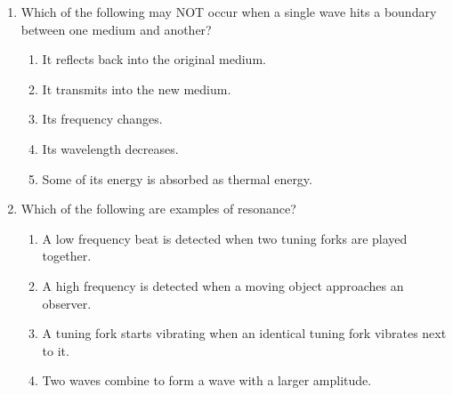 \documentclass{../../../oss-classkick}
\begin{document}
\begin{multicols}{2}
\begin{enumerate}[leftmargin=18pt,resume]
  \item Which of the following may NOT occur when a single wave hits a boundary
    between one medium and another?
    \begin{enumerate}[nosep,leftmargin=18pt,label=(\Alph*)]
    \item It reflects back into the original medium.
    \item It transmits into the new medium.
    \item Its frequency changes.
    \item Its wavelength decreases.
    \item Some of its energy is absorbed as thermal energy.
    \end{enumerate}
    \vspace{.7in}
    
  \item Which of the following are examples of resonance?
    \label{multi-last}
    \begin{enumerate}[nosep,leftmargin=18pt,label=(\Alph*)]
    \item A low frequency beat is detected when two tuning forks are played
      together.
    \item A high frequency is detected when a moving object approaches an
      observer.
    \item A tuning fork starts vibrating when an identical tuning fork vibrates
      next to it.
    \item Two waves combine to form a wave with a larger amplitude.
    \end{enumerate}
  \end{enumerate}
\end{multicols}
\newpage


\genfreedirections
\end{document}
